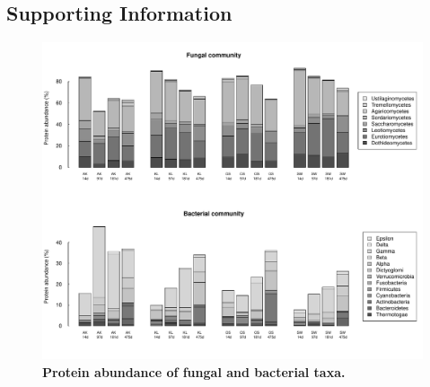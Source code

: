 \documentclass[10pt]{article}
\begin{document}
\begin{flushleft}
\section*{Supporting Information}


\newpage


\newpage
\begin{figure}[h!]
\vspace*{2mm}
\begin{center}
\includegraphics{ligpaper-metaprot2}
\end{center}
\caption{
{\bf Protein abundance of fungal and bacterial taxa.}}
\label{fig:metaprot_barplot}
\end{figure}

\newpage



\begin{landscape}


\end{landscape}
\end{flushleft}
\end{document}
